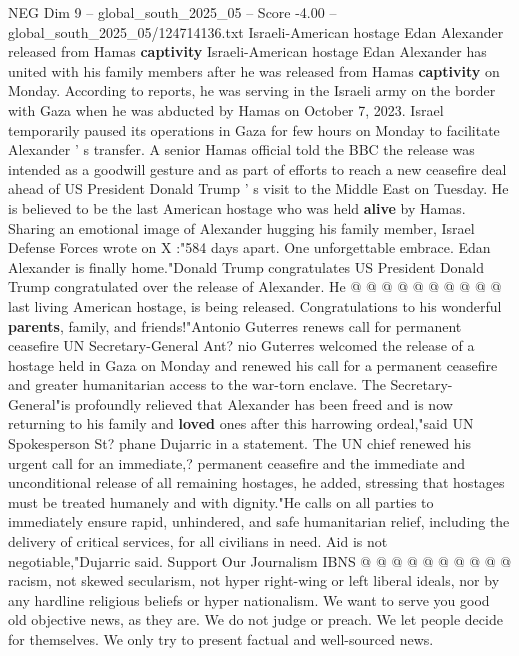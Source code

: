\begin{textsample}{NEG Dim 9 – global\_south\_2025\_05 – Score -4.00 – global\_south\_2025\_05/124714136.txt}  \label{ex:f9_neg_230}
Israeli-American hostage Edan Alexander released from Hamas \textbf{captivity} Israeli-American hostage Edan Alexander has united with his family members after he was released from Hamas \textbf{captivity} on Monday.
According to reports, he was serving in the Israeli army on the border with Gaza when he was abducted by Hamas on October 7, 2023.
Israel temporarily paused its operations in Gaza for few hours on Monday to facilitate Alexander ' s transfer.
A senior Hamas official told the BBC the release was intended as a goodwill gesture and as part of efforts to reach a new ceasefire deal ahead of US President Donald Trump ' s visit to the Middle East on Tuesday.
He is believed to be the last American hostage who was held \textbf{alive} by Hamas.
Sharing an emotional image of Alexander hugging his family member, Israel Defense Forces wrote on X :"584 days apart.
One unforgettable embrace.
Edan Alexander is finally home."Donald Trump congratulates US President Donald Trump congratulated over the release of Alexander.
He @ @ @ @ @ @ @ @ @ @ last living American hostage, is being released.
Congratulations to his wonderful \textbf{parents}, family, and friends!"Antonio Guterres renews call for permanent ceasefire UN Secretary-General Ant? nio Guterres welcomed the release of a hostage held in Gaza on Monday and renewed his call for a permanent ceasefire and greater humanitarian access to the war-torn enclave.
The Secretary-General"is profoundly relieved that Alexander has been freed and is now returning to his family and \textbf{loved} ones after this harrowing ordeal,"said UN Spokesperson St? phane Dujarric in a statement.
The UN chief renewed his urgent call for an immediate,? permanent ceasefire and the immediate and unconditional release of all remaining hostages, he added, stressing that hostages must be treated humanely and with dignity."He calls on all parties to immediately ensure rapid, unhindered, and safe humanitarian relief, including the delivery of critical services, for all civilians in need.
Aid is not negotiable,"Dujarric said.
Support Our Journalism IBNS @ @ @ @ @ @ @ @ @ @ racism, not skewed secularism, not hyper right-wing or left liberal ideals, nor by any hardline religious beliefs or hyper nationalism.
We want to serve you good old objective news, as they are.
We do not judge or preach.
We let people decide for themselves.
We only try to present factual and well-sourced news.

\end{textsample}

